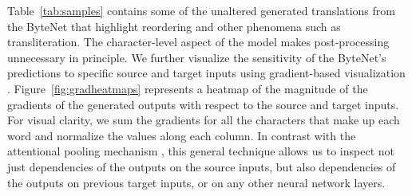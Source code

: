 \documentclass{article}
\begin{document}
Table~\ref{tab:samples} contains some of the unaltered generated translations from the ByteNet that highlight reordering and other phenomena such as transliteration. The character-level aspect of the model makes post-processing unnecessary in principle. We further visualize the sensitivity of the ByteNet's predictions to specific source and target inputs using gradient-based visualization \citep{DBLP:journals/corr/SimonyanVZ13}. Figure~\ref{fig:gradheatmaps} represents a heatmap of the magnitude of the gradients of the generated outputs with respect to the source and target inputs. For visual clarity, we sum the gradients for all the characters that make up each word and normalize the values along each column. In contrast with the attentional pooling mechanism \citep{DBLP:journals/corr/BahdanauCB14}, this general technique allows us to inspect not just dependencies of the outputs on the source inputs, but also dependencies of the outputs on previous target inputs, or on any other neural network layers.
\end{document}
